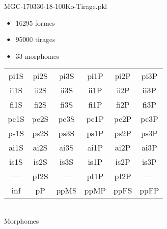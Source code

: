 MGC-170330-18-100Ko-Tirage.pkl
\begin{itemize}
\item 16295 formes
\item 95000 tirages
\item 33 morphomes
\end{itemize}
\begin{center}
\begin{tabular}{cccccc}
\hline
\cellcolor{white}pi1S & \cellcolor{orange}pi2S & \cellcolor{orange}pi3S & \cellcolor{white}pi1P & \cellcolor{white}pi2P & \cellcolor{white}pi3P\\
\cellcolor{brown}ii1S & \cellcolor{brown}ii2S & \cellcolor{brown}ii3S & \cellcolor{white}ii1P & \cellcolor{white}ii2P & \cellcolor{brown}ii3P\\
\cellcolor{yellow}fi1S & \cellcolor{lime}fi2S & \cellcolor{lime}fi3S & \cellcolor{green}fi1P & \cellcolor{white}fi2P & \cellcolor{green}fi3P\\
\cellcolor{yellow}pc1S & \cellcolor{yellow}pc2S & \cellcolor{yellow}pc3S & \cellcolor{white}pc1P & \cellcolor{white}pc2P & \cellcolor{yellow}pc3P\\
\cellcolor{teal}ps1S & \cellcolor{teal}ps2S & \cellcolor{teal}ps3S & \cellcolor{white}ps1P & \cellcolor{white}ps2P & \cellcolor{teal}ps3P\\
\cellcolor{white}ai1S & \cellcolor{lightgray}ai2S & \cellcolor{lightgray}ai3S & \cellcolor{white}ai1P & \cellcolor{blue}ai2P & \cellcolor{white}ai3P\\
\cellcolor{pink}is1S & \cellcolor{white}is2S & \cellcolor{lightgray}is3S & \cellcolor{white}is1P & \cellcolor{black}is2P & \cellcolor{pink}is3P\\
--- & \cellcolor{white}pI2S & --- & \cellcolor{white}pI1P & \cellcolor{blue}pI2P & ---\\
\cellcolor{white}inf & \cellcolor{white}pP & \cellcolor{white}ppMS & \cellcolor{white}ppMP & \cellcolor{white}ppFS & \cellcolor{white}ppFP\\
\hline
\end{tabular}\\
Morphomes
\end{center}
\bigskip

